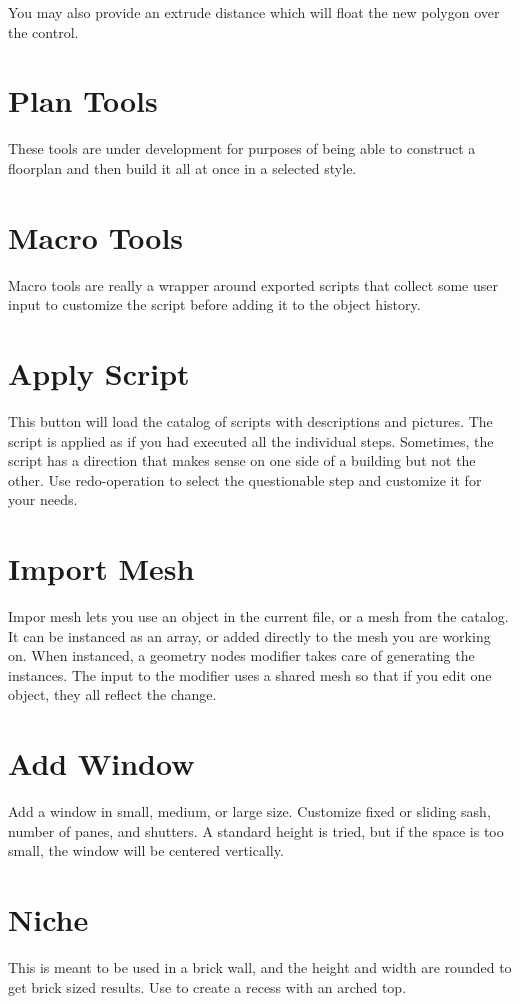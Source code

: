 \documentclass[11pt]{article}
\begin{document}
    You may also provide an extrude distance which will float the new polygon over the control.

    \section{Plan Tools}
    These tools are under development for purposes of being able to construct a floorplan and then build it all at once
    in a selected style.

    \section{Macro Tools}
    Macro tools are really a wrapper around exported scripts that collect some user input to customize the script before
    adding it to the object history.

    \section{Apply Script}
    This button will load the catalog of scripts with descriptions and pictures.
    The script is applied as if you had executed all the individual steps.
    Sometimes, the script has a direction that makes sense on one side of a building but not the other.
    Use redo-operation to select the questionable step and customize it for your needs.

    \section{Import Mesh}
    Impor mesh lets you use an object in the current file, or a mesh from the catalog.
    It can be instanced as an array, or added directly to the mesh you are working on.
    When instanced, a geometry nodes modifier takes care of generating the instances.
    The input to the modifier uses a shared mesh so that if you edit one object, they all reflect the change.

    \section{Add Window}
    Add a window in small, medium, or large size.
    Customize fixed or sliding sash, number of panes, and shutters.
    A standard height is tried, but if the space is too small, the window will be centered vertically.

    \section{Niche}
    This is meant to be used in a brick wall, and the height and width are rounded to get brick sized results.
    Use to create a recess with an arched top.
\end{document}
